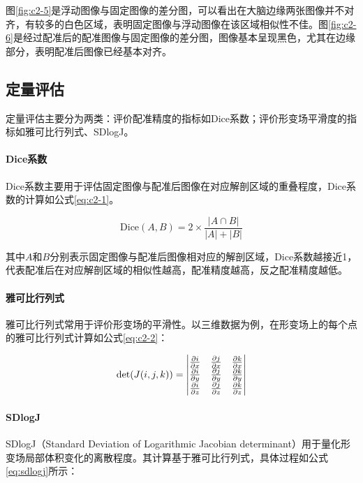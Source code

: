 图\ref{fig:c2-5}是浮动图像与固定图像的差分图，可以看出在大脑边缘两张图像并不对齐，有较多的白色区域，表明固定图像与浮动图像在该区域相似性不佳。图\ref{fig:c2-6}是经过配准后的配准图像与固定图像的差分图，图像基本呈现黑色，尤其在边缘部分，表明配准后图像已经基本对齐。

\subsection{定量评估}

定量评估主要分为两类：评价配准精度的指标如Dice系数；评价形变场平滑度的指标如雅可比行列式、SDlogJ。

\paragraph{Dice系数}

Dice系数主要用于评估固定图像与配准后图像在对应解剖区域的重叠程度，Dice系数的计算如公式\ref{eq:c2-1}。

\begin{equation}
    \mathrm{Dice}(A,B)=2\times\frac{\left|A\cap B\right|}{\left|A\right|+\left|B\right|}
    \label{eq:c2-1}
\end{equation}

其中$A$和$B$分别表示固定图像与配准后图像相对应的解剖区域，Dice系数越接近1，代表配准后在对应解剖区域的相似性越高，配准精度越高，反之配准精度越低。

\paragraph{雅可比行列式}

雅可比行列式常用于评价形变场的平滑性。以三维数据为例，在形变场上的每个点的雅可比行列式计算如公式\ref{eq:c2-2}：

\begin{equation}
    \centering
    \det(J(i,j,k))=\begin{vmatrix}\frac{\partial i}{\partial x} & \frac{\partial j}{\partial x} & \frac{\partial k}{\partial x} \\\frac{\partial i}{\partial y} & \frac{\partial j}{\partial y} & \frac{\partial k}{\partial y} \\\frac{\partial i}{\partial z} & \frac{\partial j}{\partial z} & \frac{\partial k}{\partial z}\end{vmatrix}
    \label{eq:c2-2}
\end{equation}

\paragraph{SDlogJ}
SDlogJ（Standard Deviation of Logarithmic Jacobian determinant）用于量化形变场局部体积变化的离散程度。其计算基于雅可比行列式，具体过程如公式\ref{eq:sdlogj}所示：

